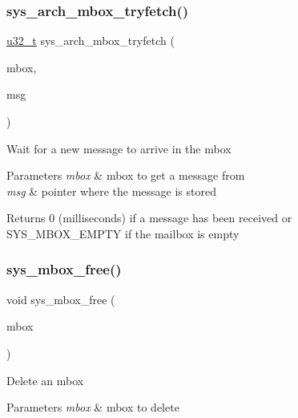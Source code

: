 \subsubsection{\texorpdfstring{sys\+\_\+arch\+\_\+mbox\+\_\+tryfetch()}{sys\_arch\_mbox\_tryfetch()}}
{\footnotesize\ttfamily \hyperlink{group__compiler__abstraction_ga4c14294869aceba3ef9d4c0c302d0f33}{u32\+\_\+t} sys\+\_\+arch\+\_\+mbox\+\_\+tryfetch (\begin{DoxyParamCaption}\item[{sys\+\_\+mbox\+\_\+t $\ast$}]{mbox,  }\item[{void $\ast$$\ast$}]{msg }\end{DoxyParamCaption})}

Wait for a new message to arrive in the mbox 
\begin{DoxyParams}{Parameters}
{\em mbox} & mbox to get a message from \\
\hline
{\em msg} & pointer where the message is stored \\
\hline
\end{DoxyParams}
\begin{DoxyReturn}{Returns}
0 (milliseconds) if a message has been received or S\+Y\+S\+\_\+\+M\+B\+O\+X\+\_\+\+E\+M\+P\+TY if the mailbox is empty 
\end{DoxyReturn}
\mbox{\label{group__sys__mbox_gac641a45812155d2234ef80dd6412882f}} 
\subsubsection{\texorpdfstring{sys\+\_\+mbox\+\_\+free()}{sys\_mbox\_free()}}
{\footnotesize\ttfamily void sys\+\_\+mbox\+\_\+free (\begin{DoxyParamCaption}\item[{sys\+\_\+mbox\+\_\+t $\ast$}]{mbox }\end{DoxyParamCaption})}

Delete an mbox 
\begin{DoxyParams}{Parameters}
{\em mbox} & mbox to delete \\
\hline
\end{DoxyParams}
\mbox{\label{group__sys__mbox_gab9793f30642de06ce87827e9adbe30cc}} 
